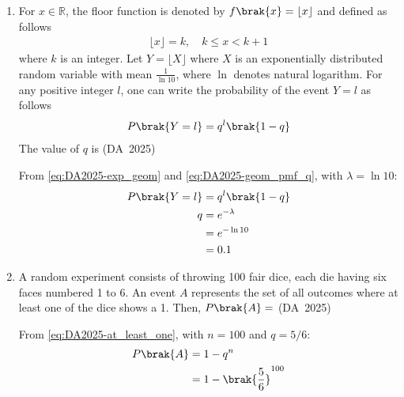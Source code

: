 \begin{enumerate}[label=\thesubsection.\arabic*, ref=\thesubsection.\theenumi]
	\item 
	For $x \in \mathbb{R}$, the floor function is denoted by $f\brak{x} = \lfloor x \rfloor$ and defined as follows
	\begin{align}
		\lfloor x \rfloor = k, \quad k \le x < k + 1
	\end{align}
	where $k$ is an integer. Let $Y = \lfloor X \rfloor$ where $X$ is an exponentially distributed random variable with mean $\frac{1}{\ln 10}$, where $\ln$ denotes natural logarithm. For any positive integer $l$, one can write the probability of the event $Y = l$ as follows
	\begin{align}
		P\brak{Y = l} = q^l\brak{1 - q}
	\end{align}
	The value of $q$ is
	\hfill (DA~2025)
	\begin{enumerate}
	\end{enumerate}
	\solution
	From \eqref{eq:DA2025-exp_geom} and \eqref{eq:DA2025-geom_pmf_q}, with $\lambda = \ln 10$:
	\begin{align}
		P\brak{Y = l} &= q^l\brak{1 - q}
		\\
		q &= e^{-\lambda}
		\\
		&= e^{-\ln 10}
		\\
		&= 0.1
	\end{align}
	
	\item 
	A random experiment consists of throwing 100 fair dice, each die having six faces numbered 1 to 6. An event $A$ represents the set of all outcomes where at least one of the dice shows a 1. Then, $P\brak{A} = $
	\hfill (DA~2025)
	\begin{enumerate}
		\begin{multicols}{4}
			\item $0$
			\item $1$
			\item $\brak{\frac{5}{6}}^{100}$
			\item $1 - \brak{\frac{5}{6}}^{100}$
		\end{multicols}
	\end{enumerate}
	\solution
	From \eqref{eq:DA2025-at_least_one}, with $n = 100$ and $q = 5/6$:
	\begin{align}
		P\brak{A} &= 1 - q^n
		\\
		&= 1 - \brak{\frac{5}{6}}^{100}
	\end{align}
	

\end{enumerate}
